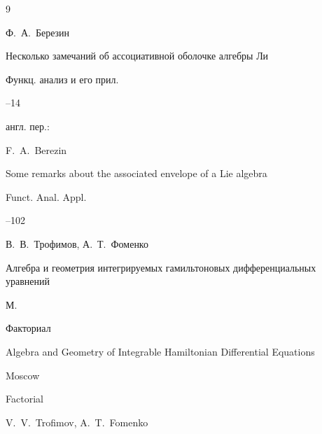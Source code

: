 \begin{thebibliography}{9}




\by Ф.~А.~Березин

\paper Несколько замечаний об ассоциативной оболочке алгебры Ли

\jour Функц. анализ и его прил.




--14




\transl англ. пер.:~

\by F.~A.~Berezin

\paper Some remarks about the associated envelope of a Lie algebra

\jour Funct. Anal. Appl.




--102





\by В.~В.~Трофимов, А.~Т.~Фоменко

\book Алгебра и геометрия интегрируемых гамильтоновых дифференциальных уравнений


\publaddr М.

\publ Факториал


\misctransl

\book Algebra and Geometry of Integrable Hamiltonian Differential Equations

\publaddr Moscow

\publ Factorial



\by V.~V.~Trofimov, A.~T.~Fomenko





\end{thebibliography}
